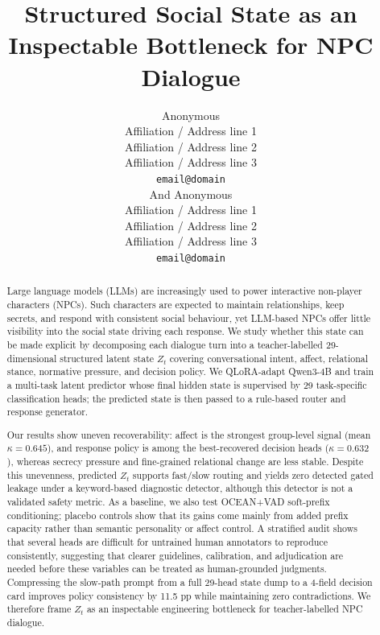 \documentclass[11pt]{article}
\title{Structured Social State as an Inspectable Bottleneck for NPC Dialogue}
\author{Anonymous \\
  Affiliation / Address line 1 \\
  Affiliation / Address line 2 \\
  Affiliation / Address line 3 \\
  \texttt{email@domain} \\And
  Anonymous \\
  Affiliation / Address line 1 \\
  Affiliation / Address line 2 \\
  Affiliation / Address line 3 \\
  \texttt{email@domain} \\}
\begin{document}
\maketitle

\begin{abstract}
Large language models (LLMs) are increasingly used to power interactive non-player characters (NPCs). Such characters are expected to maintain relationships, keep secrets, and respond with consistent social behaviour, yet LLM-based NPCs offer little visibility into the social state driving each response. We study whether this state can be made explicit by decomposing each dialogue turn into a teacher-labelled 29-dimensional structured latent state $Z_t$ covering conversational intent, affect, relational stance, normative pressure, and decision policy. We QLoRA-adapt Qwen3-4B and train a multi-task latent predictor whose final hidden state is supervised by 29 task-specific classification heads; the predicted state is then passed to a rule-based router and response generator.

Our results show uneven recoverability: affect is the strongest group-level signal (mean $\kappa{=}0.645$), and response policy is among the best-recovered decision heads ($\kappa{=}0.632$), whereas secrecy pressure and fine-grained relational change are less stable. Despite this unevenness, predicted $Z_t$ supports fast/slow routing and yields zero detected gated leakage under a keyword-based diagnostic detector, although this detector is not a validated safety metric. As a baseline, we also test OCEAN+VAD soft-prefix conditioning; placebo controls show that its gains come mainly from added prefix capacity rather than semantic personality or affect control. A stratified audit shows that several heads are difficult for untrained human annotators to reproduce consistently, suggesting that clearer guidelines, calibration, and adjudication are needed before these variables can be treated as human-grounded judgments. Compressing the slow-path prompt from a full 29-head state dump to a 4-field decision card improves policy consistency by 11.5 pp while maintaining zero contradictions. We therefore frame $Z_t$ as an inspectable engineering bottleneck for teacher-labelled NPC dialogue.


\end{abstract}
\end{document}
